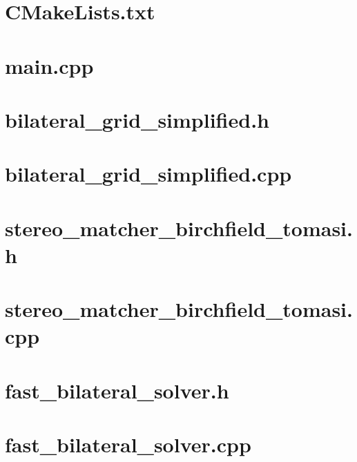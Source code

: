 \documentclass[openany]{book}
\begin{document}
\tableofcontents
\cleardoublepage

\chapter{CMakeLists.txt}

\chapter{main.cpp}

\chapter{bilateral\_grid\_simplified.h}

\chapter{bilateral\_grid\_simplified.cpp}

\chapter{stereo\_matcher\_birchfield\_tomasi.h}

\chapter{stereo\_matcher\_birchfield\_tomasi.cpp}

\chapter{fast\_bilateral\_solver.h}

\chapter{fast\_bilateral\_solver.cpp}

\end{document}
